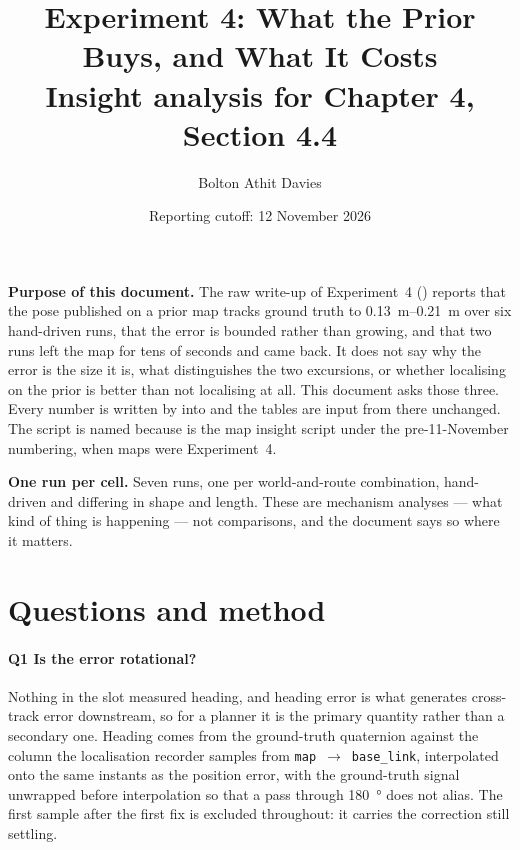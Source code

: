 \documentclass[11pt,a4paper,notitlepage]{report}
\title{Experiment 4: What the Prior Buys, and What It Costs\\
       \large Insight analysis for Chapter 4, Section 4.4}
\author{Bolton Athit Davies}
\date{Reporting cutoff: 12 November 2026}
\begin{document}
\maketitle

\noindent\textbf{Purpose of this document.} The raw write-up of Experiment~4
() reports that the pose published on a prior map
tracks ground truth to \SIrange{0.13}{0.21}{\metre} over six hand-driven runs,
that the error is bounded rather than growing, and that two runs left the map for
tens of seconds and came back. It does not say why the error is the size it is,
what distinguishes the two excursions, or whether localising on the prior is
better than not localising at all. This document asks those three. Every number
is written by  into
 and the tables are input
from there unchanged. The script is named  because
 is the map insight script under the pre-11-November
numbering, when maps were Experiment~4.

\noindent\textbf{One run per cell.} Seven runs, one per world-and-route
combination, hand-driven and differing in shape and length. These are mechanism
analyses --- what kind of thing is happening --- not comparisons, and the
document says so where it matters.

\FloatBarrier
\section{Questions and method}

\paragraph{Q1 Is the error rotational?} Nothing in the slot measured heading,
and heading error is what generates cross-track error downstream, so for a
planner it is the primary quantity rather than a secondary one. Heading comes
from the ground-truth quaternion against the  column the
localisation recorder samples from \texttt{map}~$\rightarrow$~\texttt{base\_link},
interpolated onto the same instants as the position error, with the ground-truth
signal unwrapped before interpolation so that a pass through
\SI{180}{\degree} does not alias. The first sample after the first fix is
excluded throughout: it carries the correction still settling.
\end{document}
